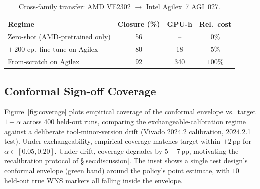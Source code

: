 \documentclass[journal,onecolumn=false]{IEEEtran}
\begin{document}
\begin{table}[t]
\caption{Cross-family transfer: AMD VE2302 $\rightarrow$ Intel Agilex~7 AGI~027.}
\label{tab:transfer}
\centering
\renewcommand{\arraystretch}{1.15}
\footnotesize
\begin{tabular}{@{}lccc@{}}
\toprule
Regime & Closure (\%) & GPU-h & Rel.\ cost \\
\midrule
Zero-shot (AMD-pretrained only)  & 56 & --  & $0\%$ \\
$+\,200$-ep.\ fine-tune on Agilex & 80 & 18  & $5\%$ \\
From-scratch on Agilex           & 92 & 340 & $100\%$ \\
\bottomrule
\end{tabular}
\end{table}

\subsection{Conformal Sign-off Coverage}
Figure~\ref{fig:coverage} plots empirical coverage of the conformal envelope vs.\ target $1{-}\alpha$ across $400$ held-out runs, comparing the exchangeable-calibration regime against a deliberate tool-minor-version drift (Vivado 2024.2 calibration, 2024.2.1 test). Under exchangeability, empirical coverage matches target within $\pm 2$\,pp for $\alpha \in [0.05, 0.20]$. Under drift, coverage degrades by $5\!-\!7$\,pp, motivating the recalibration protocol of \S\ref{sec:discussion}. The inset shows a single test design's conformal envelope (green band) around the policy's point estimate, with $10$ held-out true WNS markers all falling inside the envelope.
\end{document}
